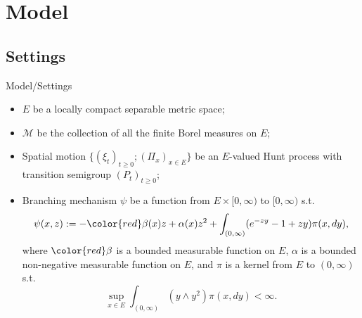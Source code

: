 \documentclass[xcolor=dvipsnames]{beamer}
\begin{document}
\section{Model}
\subsection{Settings}
\begin{frame}{Model/Settings}
  \begin{itemize}
  \item
    {\color{red}$E$} be a locally compact separable metric space;
  \item
    {\color{red} $\mathcal M$} be the collection of all the finite Borel measures on $E$; 
  \item
    Spatial motion {\color{red} $\{(\xi_t)_{t\geq 0}; (\Pi_x)_{x\in E}\}$} be an $E$-valued Hunt process with transition semigroup {\color{red} $(P_t)_{t\geq 0}$};
  \item
    Branching mechanism {\color{red} $\psi$} be a function from $E\times [0,\infty)$ to $[0,\infty)$ s.t.
    \[
      \psi(x,z) 
      := -{\color{red} \beta(x)}z+\alpha(x)z^2 +\int_{(0,\infty)}(e^{-zy}-1+zy)\pi(x,dy),
    \]
    where ${\color{red}\beta}$ is a bounded measurable function on $E$, $\alpha$ is a bounded non-negative measurable function on $E$, and $\pi$ is a kernel from $E$ to $(0,\infty)$ s.t. 
    \[
      \sup_{x\in E} \int_{(0,\infty)}(y\wedge y^2)\pi(x,dy)<\infty.
    \] 
  \end{itemize}
\end{frame}

\end{document}
